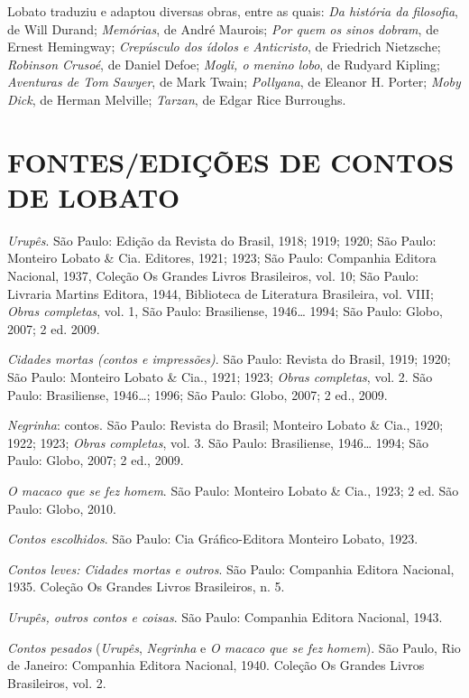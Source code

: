 Lobato traduziu e adaptou diversas obras, entre as quais: \emph{Da
história da filosofia}, de Will Durand; \emph{Memórias}, de André
Maurois; \emph{Por quem os sinos dobram}, de Ernest Hemingway;
\emph{Crepúsculo dos ídolos e Anticristo}, de Friedrich Nietzsche;
\emph{Robinson Crusoé}, de Daniel Defoe; \emph{Mogli, o menino lobo}, de
Rudyard Kipling; \emph{Aventuras de Tom Sawyer}, de Mark Twain;
\emph{Pollyana}, de Eleanor H. Porter; \emph{Moby Dick}, de Herman
Melville; \emph{Tarzan}, de Edgar Rice Burroughs.

\section{FONTES/EDIÇÕES DE CONTOS DE LOBATO}

\emph{Urupês}. São Paulo: Edição da Revista do Brasil, 1918; 1919; 1920;
São Paulo: Monteiro Lobato \& Cia. Editores, 1921; 1923; São Paulo:
Companhia Editora Nacional, 1937, Coleção Os Grandes Livros Brasileiros,
vol. 10; São Paulo: Livraria Martins Editora, 1944, Biblioteca de
Literatura Brasileira, vol. VIII; \emph{Obras completas}, vol. 1, São
Paulo: Brasiliense, 1946\ldots{} 1994; São Paulo: Globo, 2007; 2 ed.
2009.

\emph{Cidades mortas (contos e impressões)}. São Paulo: Revista do
Brasil, 1919; 1920; São Paulo: Monteiro Lobato \& Cia., 1921; 1923;
\emph{Obras completas}, vol. 2. São Paulo: Brasiliense, 1946\ldots{};
1996; São Paulo: Globo, 2007; 2 ed., 2009.

\emph{Negrinha}: contos. São Paulo: Revista do Brasil; Monteiro Lobato
\& Cia., 1920; 1922; 1923; \emph{Obras completas}, vol. 3. São Paulo:
Brasiliense, 1946\ldots{} 1994; São Paulo: Globo, 2007; 2 ed., 2009.

\emph{O macaco que se fez homem}. São Paulo: Monteiro Lobato \& Cia.,
1923; 2 ed. São Paulo: Globo, 2010.

\emph{Contos escolhidos}. São Paulo: Cia Gráfico-Editora Monteiro Lobato, 1923.

\emph{Contos leves: Cidades mortas e outros}. São Paulo: Companhia
Editora Nacional, 1935. Coleção Os Grandes Livros Brasileiros, n. 5.

\emph{Urupês, outros contos e coisas}. São Paulo: Companhia Editora
Nacional, 1943.

\emph{Contos pesados} (\emph{Urupês}, \emph{Negrinha} e \emph{O macaco
que se fez homem}). São Paulo, Rio de Janeiro: Companhia Editora Nacional, 1940.
Coleção Os Grandes Livros Brasileiros, vol. 2.

